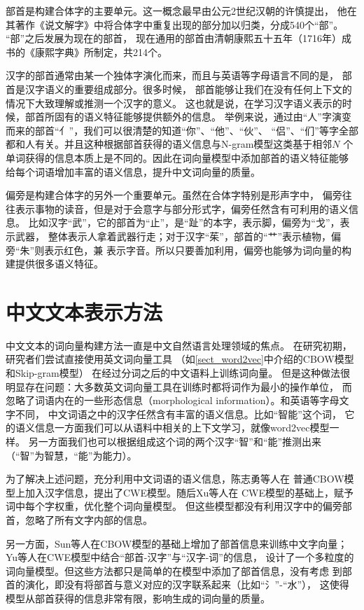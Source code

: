 部首是构建合体字的主要单元。这一概念最早由公元2世纪汉朝的许慎提出，
他在其著作《说文解字》中将合体字中重复出现的部分加以归类，分成540个“部”。
“部”之后发展为现在的部首，
现在通用的部首由清朝康熙五十五年（1716年）成书的《康熙字典》所制定，共214个。

汉字的部首通常由某一个独体字演化而来，而且与英语等字母语言不同的是，
部首是汉字语义的重要组成部分。很多时候，
部首能够让我们在没有任何上下文的情况下大致理解或推测一个汉字的意义。
这也就是说，在学习汉字语义表示的时候，部首所固有的语义特征能够提供额外的信息。
举例来说，通过由“人”字演变而来的部首“亻”，我们可以很清楚的知道“你”、“他”、“伙”、
“侣”、“们”等字全部都和人有关。并且这种根据部首获得的语义信息与N-gram模型这类基于相邻$N$
个单词获得的信息本质上是不同的。因此在词向量模型中添加部首的语义特征能够
给每个词语增加丰富的语义信息，提升中文词向量的质量。

偏旁是构建合体字的另外一个重要单元。虽然在合体字特别是形声字中，
偏旁往往表示事物的读音，但是对于会意字与部分形式字，偏旁任然含有可利用的语义信息。
比如汉字“武”，它的部首为“止”，是“趾”的本字，表示脚，偏旁为“戈”，表示武器，
整体表示人拿着武器行走；对于汉字“茱”，部首的“艹”表示植物，偏旁“朱”则表示红色，兼
表示字音。所以只要善加利用，偏旁也能够为词向量的构建提供很多语义特征。

\section{中文文本表示方法}
\label{word_vec_model}
中文文本的词向量构建方法一直是中文自然语言处理领域的焦点。
在研究初期，研究者们尝试直接使用英文词向量工具
（如\ref{sect_word2vec}中介绍的CBOW模型和Skip-gram模型）
在经过分词之后的中文语料上训练词向量。
但是这种做法很明显存在问题：大多数英文词向量工具在训练时都将词作为最小的操作单位，
而忽略了词语内在的一些形态信息（morphological information）。和英语等字母文字不同，
中文词语之中的汉字任然含有丰富的语义信息。比如“智能”这个词，
它的语义信息一方面我们可以从语料中相关的上下文学习，就像word2vec模型一样。
另一方面我们也可以根据组成这个词的两个汉字“智”和“能”推测出来（“智”为智慧，“能”为能力）。

为了解决上述问题，充分利用中文词语的语义信息，陈志勇等人在
普通CBOW模型上加入汉字信息，提出了CWE模型。随后Xu等人在
CWE模型的基础上，赋予词中每个字权重，优化整个词向量模型。
但这些模型都没有利用汉字中的偏旁部首，忽略了所有文字内部的信息。

另一方面，Sun等人在CBOW模型的基础上增加了部首信息来训练中文字向量；
Yu等人在CWE模型中结合“部首-汉字”与“汉字-词”的信息，
设计了一个多粒度的词向量模型。但这些方法都只是简单的在模型中添加了部首信息，没有考虑
到部首的演化，即没有将部首与意义对应的汉字联系起来（比如“氵”-“水”），
这使得模型从部首获得的信息非常有限，影响生成的词向量的质量。


